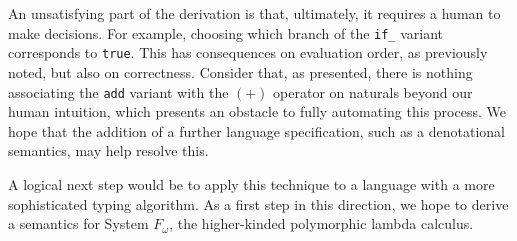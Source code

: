 \documentclass[manuscript,screen,sigplan]{acmart}
\begin{document}
An unsatisfying part of the derivation is that, ultimately, it requires a human
to make decisions. For example, choosing which branch of the \texttt{if\_}
variant corresponds to \texttt{true}. This has consequences on evaluation
order, as previously noted, but also on correctness. Consider that, as
presented, there is nothing associating the \texttt{add} variant with the $(+)$
operator on naturals beyond our human intuition, which presents an obstacle to
fully automating this process. We hope that the addition of a further language
specification, such as a denotational semantics, may help resolve this.

A logical next step would be to apply this technique to a language with a more
sophisticated typing algorithm. As a first step in this direction, we hope to
derive a semantics for System $F_{\omega}$, the higher-kinded polymorphic
lambda calculus.



\end{document}

